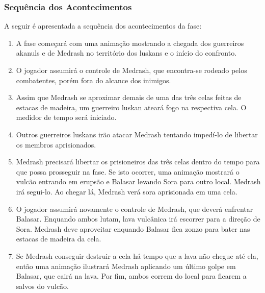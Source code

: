 \subsubsection{Sequência dos Acontecimentos}

A seguir é apresentada a sequência dos acontecimentos da fase:

\begin{enumerate}
\item A fase começará com uma animação mostrando a chegada dos guerreiros akanuls e de Medrash no território dos luskans e o início do confronto.
\item O jogador assumirá o controle de Medrash, que encontra-se rodeado pelos combatentes, porém fora do alcance dos inimigos.
\item Assim que Medrash se aproximar demais de uma das três celas feitas de estacas de madeira, um guerreiro luskan ateará fogo na respectiva cela. O medidor de tempo será iniciado.
\item Outros guerreiros luskans irão atacar Medrash tentando impedí-lo de libertar os membros aprisionados.
\item Medrash precisará libertar os prisioneiros das três celas dentro do tempo para que possa prosseguir na fase. Se isto ocorrer, uma animação mostrará o vulcão entrando em erupsão e Balasar levando Sora para outro local. Medrash irá segui-lo. Ao chegar lá, Medrash verá sora aprisionada em uma cela.
\item O jogador assumirá novamente o controle de Medrash, que deverá enfrentar Balasar. Enquando ambos lutam, lava vulcânica irá escorrer para a direção de Sora. Medrash deve aproveitar enquando Balasar fica zonzo para bater nas estacas de madeira da cela.
\item Se Medrash conseguir destruir a cela há tempo que a lava não chegue até ela, então uma animação ilustrará Medrash aplicando um último golpe em Balasar, que cairá na lava. Por fim, ambos correm do local para ficarem a salvos do vulcão.
\end{enumerate}